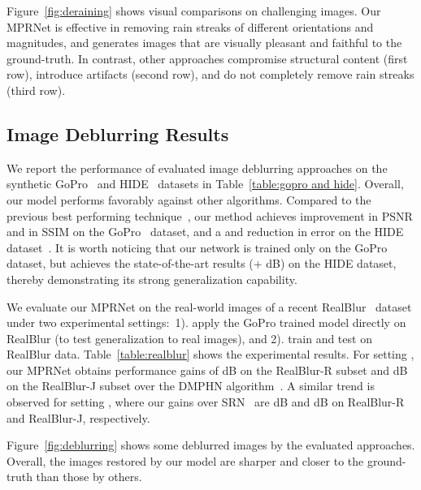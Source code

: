 \documentclass[10pt,twocolumn,letterpaper]{article}
\begin{document}
Figure~\ref{fig:deraining} shows visual comparisons on challenging images. 
Our MPRNet is effective in removing rain streaks of different orientations and magnitudes, and generates images that are visually pleasant and faithful to the ground-truth.
In contrast, other approaches compromise structural content (first row), introduce artifacts (second row), and do not completely remove rain streaks (third row). 


\subsection{Image Deblurring Results}
We report the performance of evaluated image deblurring approaches on the synthetic GoPro~\cite{gopro2017} and HIDE~\cite{shen2019human} datasets in Table~\ref{table:gopro and hide}.  
Overall, our model performs favorably against other algorithms.
Compared to the previous best performing technique~\cite{Maitreya2020}, our method achieves  improvement in PSNR and  in SSIM on the GoPro~\cite{gopro2017} dataset, and a  and  reduction in error on the HIDE dataset~\cite{shen2019human}. 
It is worth noticing that our network is trained only on the GoPro dataset, but achieves the state-of-the-art results (+ dB) on the HIDE dataset, thereby demonstrating its strong generalization capability. 


We evaluate our MPRNet on the real-world images of a recent RealBlur~\cite{rim_2020_realblur} dataset under two experimental settings:~1). apply the GoPro trained model directly on RealBlur (to test generalization to real images), and 2). train and test on RealBlur data. 
Table~\ref{table:realblur} shows the experimental results. 
For setting , our MPRNet obtains performance gains of  dB on the RealBlur-R subset and  dB on the RealBlur-J subset over the DMPHN algorithm~\cite{dmphn2019}. 
A similar trend is observed for setting , where our gains over SRN~\cite{tao2018scale} are  dB and  dB on RealBlur-R and RealBlur-J, respectively. 


Figure~\ref{fig:deblurring} shows some deblurred images by the evaluated approaches.
Overall, the images restored by our model are sharper and closer to the ground-truth than those by others.
\end{document}
